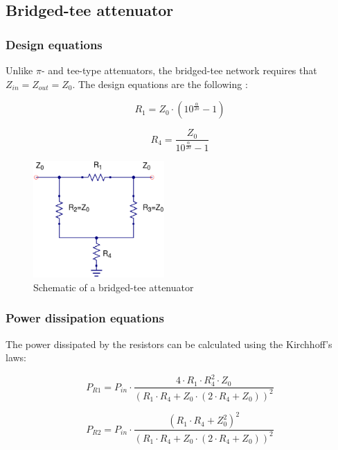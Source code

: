 \clearpage
\subsection{Bridged-tee attenuator}
\subsubsection{Design equations}

\noindent Unlike $\pi$- and tee-type attenuators, the bridged-tee network requires that $Z_{in} = Z_{out} = Z_{0}$. The design equations are the following \cite{Vizmuller}:

\begin{equation}
R_{1} = Z_{0} \cdot \left( 10^{\frac{\alpha}{20}} -1 \right)
\end{equation}

\begin{equation}
R_{4} = \dfrac{Z_{0}}{  10^{\frac{\alpha}{20}} -1 }
\end{equation}

\begin{figure}[ht]
\begin{center}
\includegraphics[width=5cm]{Bridged-Tee-Schematic}
\end{center}
\caption{Schematic of a bridged-tee attenuator}
\label{fig:bridged_pow_diss_Zin_50_Zout_75}
\end{figure}
\FloatBarrier

\subsubsection{Power dissipation equations}

\noindent The power dissipated by the resistors can be calculated using the Kirchhoff's laws:

\begin{equation}
P_{R1} = P_{in} \cdot \dfrac{4\cdot R_1\cdot R_4^2 \cdot Z_0}{ (R_1 \cdot R_4 + Z_0 \cdot (2 \cdot R_4 + Z_0))^2}
\end{equation}

\begin{equation}
P_{R2} = P_{in} \cdot \dfrac{(R_1 \cdot R_4 + Z_0^2)^2 }{ (R_1 \cdot R_4 + Z_0 \cdot (2 \cdot R_4 + Z_0))^2}
\end{equation}

